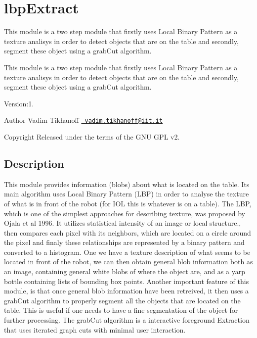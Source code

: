 \section{lbp\+Extract}
\label{group__lbpExtract}


This module is a two step module that firstly uses Local Binary Pattern as a texture analisys in order to detect objects that are on the table and secondly, segment these object using a grab\+Cut algorithm.  


This module is a two step module that firstly uses Local Binary Pattern as a texture analisys in order to detect objects that are on the table and secondly, segment these object using a grab\+Cut algorithm. 

Version\+:1. \begin{DoxyAuthor}{Author}
Vadim Tikhanoff \href{mailto:vadim.tikhanoff@iit.it}{\texttt{ vadim.\+tikhanoff@iit.\+it}} ~\newline
 
\end{DoxyAuthor}
\begin{DoxyCopyright}{Copyright}
Released under the terms of the G\+NU G\+PL v2. 
\end{DoxyCopyright}
\hypertarget{group__seg2cloud_intro_sec}{}\subsection{Description}\label{group__seg2cloud_intro_sec}
\begin{DoxyVerb}This module provides information (blobs) about what is located on the table. Its main algorithm uses Local Binary Pattern (LBP) in order to analyse the texture of what is in front of the robot (for IOL this is whatever is on a table). The LBP, which is one of the simplest approaches for describing texture, was proposed by Ojala et al 1996. It utilizes statistical intensity of an image or local structure., then compares each pixel with its neighbors, which are located on a circle around the pixel and finaly these relationships are represented by a binary pattern and converted to a histogram. One we have a texture description of what seems to be located in front of the robot, we can then obtain general blob information both as an image, containing general white blobs of where the object are, and as a yarp bottle containing lists of bounding box points.
Another important feature of this module, is that once general blob information have been retreived, it then uses a grabCut algorithm to properly segment all the objects that are located on the table. This is useful if one needs to have a fine segmentation of the object for further processing. The grabCut algorithm is a interactive foreground Extraction that uses iterated graph cuts with minimal user interaction.
\end{DoxyVerb}


